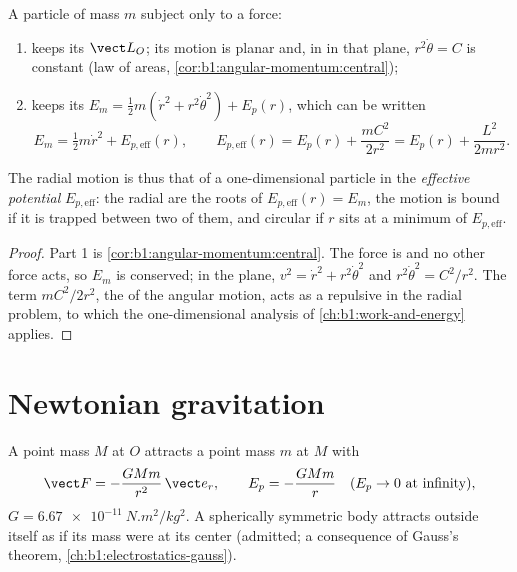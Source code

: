 \begin{theorem}\label{thm:b1:central-forces:reduction}
A particle of mass $m$ subject only to a  force:
\begin{enumerate}
  \item keeps its  $\vect L_O$; its motion is planar and,
        in  in that plane, $r^2\dot\theta = C$ is
        constant (law of areas, \cref{cor:b1:angular-momentum:central});
  \item keeps its  $E_m = \tfrac12 m(\dot r^2 + r^2\dot\theta^2)
        + E_p(r)$, which can be written
        \[
        E_m = \tfrac12 m\dot r^2 + E_{p,\mathrm{eff}}(r), \qquad
        E_{p,\mathrm{eff}}(r) = E_p(r) + \frac{mC^2}{2r^2} = E_p(r) + \frac{L^2}{2mr^2} .
        \]
\end{enumerate}
The radial motion is thus that of a one-dimensional particle in the
\emph{effective potential} $E_{p,\mathrm{eff}}$: the radial  are the roots of $E_{p,\mathrm{eff}}(r) = E_m$, the motion is
bound if it is trapped between two of them, and circular if $r$ sits at
a minimum of $E_{p,\mathrm{eff}}$.
\end{theorem}

\begin{proof}
Part 1 is \cref{cor:b1:angular-momentum:central}. The force is
 and no other force acts, so $E_m$ is conserved; in the
plane, $v^2 = \dot r^2 + r^2\dot\theta^2$ and $r^2\dot\theta^2 = C^2/r^2$.
The term $mC^2/2r^2$, the  of the angular motion, acts as
a repulsive \emph{} in the radial problem, to which
the one-dimensional analysis of \cref{ch:b1:work-and-energy} applies.
\end{proof}

\section{Newtonian gravitation}

\begin{definition}\label{def:b1:central-forces:gravitation}
A point mass $M$ at $O$ attracts a point mass $m$ at $M$ with
\[
\vect F = -\frac{GMm}{r^2}\,\vect e_r, \qquad E_p = -\frac{GMm}{r} \quad (E_p \to 0 \text{ at infinity}),
\]
$G = \qty{6.67e-11}{N.m^2/kg^2}$. A spherically symmetric body attracts
outside itself as if its mass were at its center (admitted; a
consequence of Gauss's theorem, \cref{ch:b1:electrostatics-gauss}).
\end{definition}

